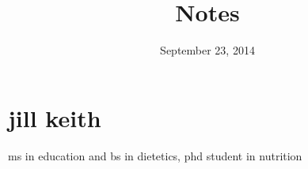 \documentclass[letterpaper]{article}
\begin{document}
\title{Notes}
\date{September 23, 2014}
\maketitle
\section*{jill keith}
ms in education and bs in dietetics, phd student in nutrition
\end{document}
